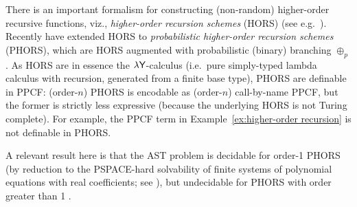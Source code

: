 There is an important formalism for constructing (non-random) higher-order recursive functions, viz., \emph{higher-order recursion schemes} (HORS) (see e.g.~\cite{DBLP:conf/lics/Ong06,DBLP:conf/lics/Ong15}).
Recently \cite{DBLP:conf/lics/KobayashiLG19} have extended HORS to \emph{probabilistic higher-order recursion schemes} (PHORS), which are HORS augmented with probabilistic (binary) branching $\oplus_p$.
As HORS are in essence the $\lambda \mathsf{Y}$-calculus \citep{DBLP:conf/lics/Statman02} (i.e.~pure simply-typed lambda calculus with recursion, generated from a finite base type), PHORS are definable in PPCF:
(order-$n$) PHORS is encodable as (order-$n$) call-by-name PPCF, but the former is strictly less expressive (because the underlying HORS is not Turing complete). 
For example, the PPCF term in Example~\ref{ex:higher-order recursion} is not definable in PHORS.

A relevant result here is that the AST problem is decidable for order-1 PHORS (by reduction to the PSPACE-hard solvability of finite systems of polynomial equations with real coefficients; see \citep{DBLP:journals/jacm/EtessamiY09}), but undecidable for PHORS with order greater than 1 \citep{DBLP:conf/lics/KobayashiLG19}.

